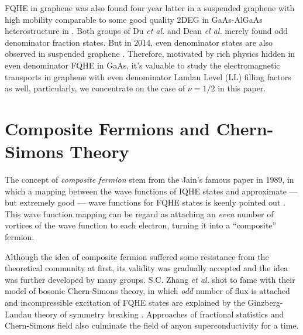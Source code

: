 \documentclass[bachelor,english,numbers]{ustcthesis}
\begin{document}
		FQHE in graphene was also found four year latter in a suspended graphene with high mobility comparable to some good quality 2DEG in GaAs-AlGaAs heterostructure in \cite{du2009fractional,dean2011multicomponent}. Both groups of Du {\it et al.} and Dean {\it el al.} merely found odd denominator fraction states. But in 2014, even denominator states are also observed in suspended graphene \cite{ki2014observation}. Therefore, motivated by rich physics hidden in even denominator FQHE in GaAs, it's valuable to study the electromagnetic transports in graphene with even denominator Landau Level (LL) filling factors as well, particularly, we concentrate on the case of $\nu=1/2$ in this paper.

	\section{Composite Fermions and Chern-Simons Theory}
		\indent\par The concept of \emph{composite fermion} stem from the Jain's famous paper in 1989, in which a mapping between the wave functions of IQHE states and approximate --- but extremely good --- wave functions for FQHE states is keenly pointed out \cite{jain1989composite}. This wave function mapping can be regard as attaching an \emph{even} number of vortices of the wave function to each electron, turning it into a ``composite'' fermion.\par

		Although the idea of composite fermion suffered some resistance from the theoretical community at first, its validity was gradually accepted and the idea was further developed by many groups. S.C. Zhang {\it et al.} shot to fame with their model of bosonic Chern-Simons theory, in which \emph{odd} number of flux is attached and incompressible excitation of FQHE states are explained by the Ginzberg-Landau theory of symmetry breaking \cite{zhang1989effective}. Approaches of fractional statistics and Chern-Simons field also culminate the field of anyon superconductivity \cite{wilczek1990fractional,chen1989anyon} for a time.
\end{document}
